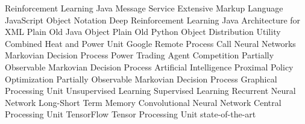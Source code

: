 \begin        {acronym}[Bash]

	       {Reinforcement Learning}
	      {Java Message Service}
	      {Extensive Markup Language}
	     {JavaScript Object Notation}
	   {Deep Reinforcement Learning}
	     {Java Architecture for XML}
	     {Plain Old Java Object}
	     {Plain Old Python Object}
	       {Distribution Utility}
	      {Combined Heat and Power Unit}
	     {Google Remote Process Call}
	       {Neural Networks}
	      {Markovian Decision Process}
	 {Power Trading Agent Competition}
	    {Partially Observable Markovian Decision Process}
	       {Artificial Intelligence}
	      {Proximal Policy Optimization}
	    {Partially Observable Markovian Decision Process}
	      {Graphical Processing Unit}
               {Unsupervised Learning}
               {Supervised Learning}
              {Recurrent Neural Network}
             {Long-Short Term Memory}
              {Convolutional Neural Network}
	      {Central Processing Unit}
	       {TensorFlow}
	      {Tensor Processing Unit}
	     {state-of-the-art}

\end          {acronym}
